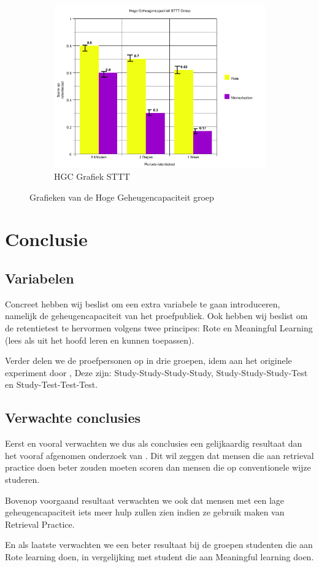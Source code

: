 \documentclass{hogent-article}
\begin{document}
\begin{figure}[H]
\begin{subfigure}{0.4\textwidth}
		\includegraphics[width=\linewidth]{grafiek5}
		\caption{HGC Grafiek STTT}
	\end{subfigure}
	\caption{Grafieken van de Hoge Geheugencapaciteit groep}
\end{figure}

\section{Conclusie}

    \subsection{Variabelen}
Concreet hebben wij beslist om een extra variabele te gaan introduceren, namelijk de geheugencapaciteit van het proefpubliek. Ook hebben wij beslist om de retentietest te hervormen volgens twee principes: Rote en Meaningful Learning (lees als uit het hoofd leren en kunnen toepassen).\\
\par
\noindent    
Verder delen we de proefpersonen op in drie groepen, idem aan het originele experiment door \cite{Henry2006} , Deze zijn: Study-Study-Study-Study, Study-Study-Study-Test  en Study-Test-Test-Test. 
\subsection{Verwachte conclusies}
\noindent
Eerst en vooral verwachten we dus als conclusies een gelijkaardig resultaat dan het vooraf afgenomen onderzoek van \cite{Henry2006}. Dit wil zeggen dat mensen die aan retrieval practice doen beter zouden moeten scoren dan mensen die op conventionele wijze studeren.\\
\par
\noindent
Bovenop voorgaand resultaat verwachten we ook dat mensen met een lage geheugencapaciteit iets meer hulp zullen zien indien ze gebruik maken van Retrieval Practice.\\
\par
\noindent
En als laatste verwachten we een beter resultaat bij de groepen studenten die aan Rote learning doen, in vergelijking met student die aan Meaningful learning doen.
\end{document}
